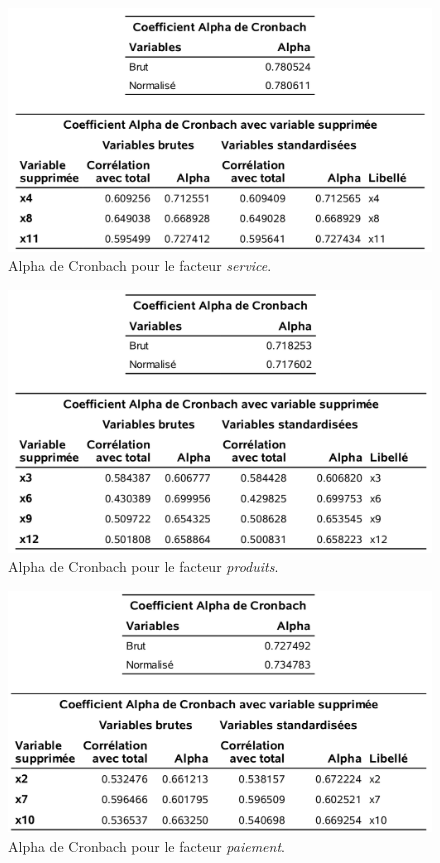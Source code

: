 \documentclass[
]{book}
\theoremstyle{definition}
\theoremstyle{definition}
\theoremstyle{definition}
\theoremstyle{remark}
\begin{document}
\begin{figure}

{\centering \includegraphics[width=0.85\linewidth]{figures/01-facto-e8} 

}

\caption{Alpha de Cronbach pour le facteur \emph{service}.}\label{fig:fig1p8}
\end{figure}

\begin{figure}

{\centering \includegraphics[width=0.85\linewidth]{figures/01-facto-e9} 

}

\caption{Alpha de Cronbach pour le facteur \emph{produits}.}\label{fig:fig1p9}
\end{figure}

\begin{figure}

{\centering \includegraphics[width=0.85\linewidth]{figures/01-facto-e10} 

}

\caption{Alpha de Cronbach pour le facteur \emph{paiement}.}\label{fig:fig1p10}
\end{figure}
\end{document}
